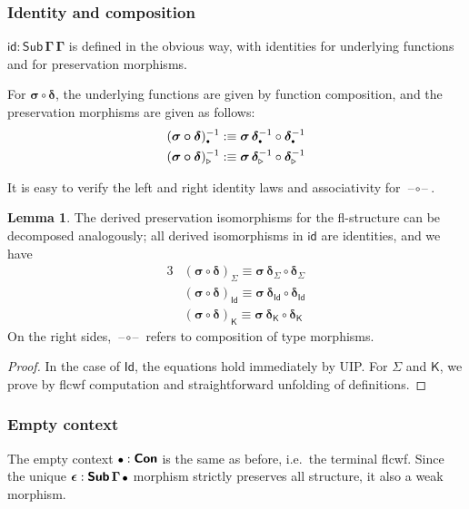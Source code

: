 \documentclass[12pt,a4paper,twoside,openany]{book}
\theoremstyle{remark}
\theoremstyle{definition}
\newtheorem{mylemma}{Lemma}
\theoremstyle{theorem}
\newcommand{\bs}[1]{\boldsymbol{#1}}
\newcommand{\id}{\mathsf{id}}
\newcommand{\Con}{\mathsf{Con}}
\newcommand{\Sub}{\mathsf{Sub}}
\newcommand{\Id}{\mathsf{Id}}
\newcommand{\blank}{\mathord{\hspace{1pt}\text{--}\hspace{1pt}}}
\newcommand{\ext}{\triangleright}
\newcommand{\emptycon}{\scaleobj{.75}\bullet}
\newcommand{\K}{\mathsf{K}}
\newcommand{\bCon}{\bs{\Con}}
\newcommand{\bSub}{\bs{\Sub}}
\newcommand{\bGamma}{\bs{\Gamma}}
\newcommand{\bsigma}{\bs{\sigma}}
\newcommand{\bdelta}{\bs{\delta}}
\newcommand{\bid}{\bs{\id}}
\newcommand{\bemptycon}{\scaleobj{.75}{\bs{\bullet}}}
\newcommand{\defn}{:\equiv}
\begin{document}
\subsubsection{Identity and composition}
\label{sec:idcomp}

$\bid : \bSub\,\bGamma\,\bGamma$ is defined in the obvious way, with identities for
underlying functions and for preservation morphisms.

For $\bs{\sigma \circ \delta}$, the underlying functions are given by
function composition, and the preservation morphisms are given as follows:
\begin{alignat*}{3}
  & (\bs{\sigma \circ \delta})_{\emptycon}^{-1} \defn
    \bsigma\,\bdelta_{\emptycon}^{-1} \circ \bdelta_{\emptycon}^{-1} \\
  & (\bs{\sigma \circ \delta})_{\ext}^{-1} \defn
    \bsigma\,\bdelta_{\ext}^{-1} \circ \bdelta_{\ext}^{-1}
\end{alignat*}

It is easy to verify the left and right identity laws and associativity for
$\bs{\blank\circ\blank}$.

\begin{mylemma}\label{lem:idcomppres}
The derived preservation isomorphisms for the fl-structure can be decomposed
analogously; all derived isomorphisms in $\bid$ are identities, and we have
\begin{alignat*}{3}
  & (\bs{\sigma \circ \delta})_{\Sigma} \equiv
  \bsigma\,\bdelta_{\Sigma} \circ \bdelta_{\Sigma}\\
  & (\bs{\sigma \circ \delta})_{\Id} \equiv
  \bsigma\,\bdelta_{\Id} \circ \bdelta_{\Id}\\
  & (\bs{\sigma \circ \delta})_{\K} \equiv
  \bsigma\,\bdelta_{\K} \circ \bdelta_{\K}
\end{alignat*}
On the right sides, $\blank\circ\blank$ refers to composition of type morphisms.
\end{mylemma}
\begin{proof}
In the case of $\Id$, the equations hold immediately by UIP. For $\Sigma$ and
$\K$, we prove by flcwf computation and straightforward unfolding of
definitions.
\end{proof}

\subsubsection{Empty context}
The empty context $\bemptycon : \bCon$ is the same as before, i.e.\ the terminal
flcwf. Since the unique $\bs{\epsilon} : \bSub\,\bGamma\,\bemptycon$ morphism
strictly preserves all structure, it also a weak morphism.
\end{document}
